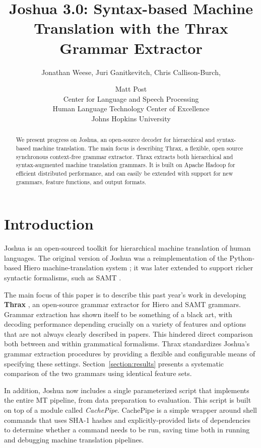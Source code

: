 \documentclass[11pt]{article}
\title{Joshua 3.0: Syntax-based Machine Translation with the Thrax
  Grammar Extractor}
\author{Jonathan Weese\aff, Juri Ganitkevitch\aff, Chris Callison-Burch\aff, \and Matt Post\afff \\
\aff Center for Language and Speech Processing \\
\afff Human Language Technology Center of Excellence \\
Johns Hopkins University}
\date{}
\begin{document}
\maketitle

\begin{abstract}
We present progress on Joshua, an open-source decoder for hierarchical
and syntax-based machine translation.  The main focus is describing
Thrax, a flexible, open source synchronous context-free grammar
extractor.  Thrax extracts both hierarchical \cite{Chiang2007} and
syntax-augmented machine translation \cite{samt2006} grammars.  It is
built on Apache Hadoop for efficient distributed performance, and can
easily be extended with support for new grammars, feature functions,
and output formats.
\end{abstract}

\section{Introduction}

Joshua is an open-sourced toolkit for hierarchical machine translation
of human languages.  The original version of Joshua \cite{Joshua-WMT}
was a reimplementation of the Python-based Hiero machine-translation
system \cite{Chiang2007}; it was later extended \cite{li2010joshua} to
support richer syntactic formalisms, such as SAMT \cite{samt2006}.

The main focus of this paper is to describe this past year's work in
developing {\bf Thrax} \cite{jonnymasters}, an open-source grammar extractor for Hiero and
SAMT grammars.  Grammar extraction has shown itself to be something of
a black art, with decoding performance depending crucially on a
variety of features and options that are not always clearly described in papers.
This hindered direct comparison both between and within grammatical formalisms.
Thrax standardizes Joshua's grammar extraction procedures by providing
a flexible and configurable means of specifying these settings.
Section~\ref{section:results} presents a systematic comparison of the
two grammars using identical feature sets.

In addition, Joshua now includes a single parameterized script that
implements the entire MT pipeline, from data preparation to
evaluation.  This script is built on top of a module called
\emph{CachePipe}.  CachePipe is a simple wrapper around shell commands
that uses SHA-1 hashes and explicitly-provided lists of dependencies
to determine whether a command needs to be run, saving time both in
running and debugging machine translation pipelines.
\end{document}
